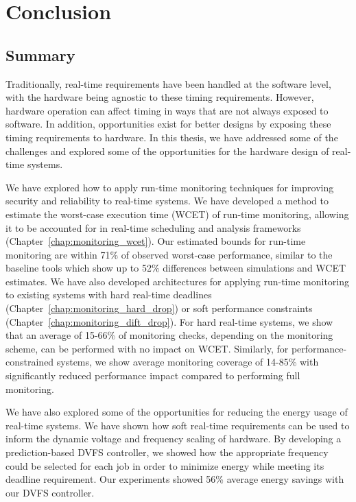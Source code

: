 \chapter{Conclusion}
\label{chap:conclusion}

\section{Summary}

Traditionally, real-time requirements have been handled at the software level,
with the hardware being agnostic to these timing requirements. However,
hardware operation can affect timing in ways that are not always exposed to
software. In addition, opportunities exist for better designs by exposing these
timing requirements to hardware. In this thesis, we have addressed some of the
challenges and explored some of the opportunities for the hardware design of
real-time systems.

We have explored how to apply run-time monitoring techniques for improving
security and reliability to real-time systems. We have developed a method
to estimate the worst-case execution time (WCET) of run-time monitoring,
allowing it to be accounted for in real-time scheduling and analysis frameworks
(Chapter~\ref{chap:monitoring_wcet}). Our estimated bounds for run-time
monitoring are within 71\% of observed worst-case performance, similar to the
baseline tools which show up to 52\% differences between simulations and WCET
estimates. We have also developed architectures for applying run-time
monitoring to existing systems with hard real-time deadlines
(Chapter~\ref{chap:monitoring_hard_drop}) or soft performance constraints
(Chapter~\ref{chap:monitoring_dift_drop}). For hard real-time systems, we show
that an average of 15-66\% of monitoring checks, depending on the monitoring
scheme, can be performed with no impact on WCET. Similarly, for
performance-constrained systems, we show average monitoring coverage of 14-85\%
with significantly reduced performance impact compared to performing full
monitoring.

We have also explored some of the opportunities for reducing the energy usage
of real-time systems. We have shown how soft real-time requirements can be used
to inform the dynamic voltage and frequency scaling of hardware. By developing
a prediction-based DVFS controller, we showed how the appropriate frequency
could be selected for each job in order to minimize energy while meeting its
deadline requirement.  Our experiments showed 56\% average energy savings with
our DVFS controller.

